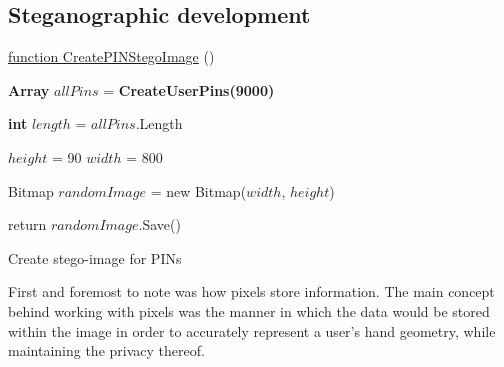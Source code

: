 \subsection{Steganographic development}


\begin{algorithm}
     
     \underline{function CreatePINStegoImage} ()\;
     
     \textbf{Array} $allPins$ = \textbf{CreateUserPins(9000)}\;
     
     
     \textbf{int} $length$ = $allPins$.Length\;
     
     $height$ = 90\;
     $width$ = 800\;
     
     Bitmap $randomImage$ = new Bitmap($width$, $height$)\;
     
     
     return $randomImage$.Save()\;
     
     \caption{Create stego-image for PINs}
     \label{alg: Create stego-image for PINs}
\end{algorithm}

First and foremost to note was how pixels store information. The main concept behind working with pixels was the manner in which the data would be stored within the image in order to accurately represent a user’s hand geometry, while maintaining the privacy thereof. 

